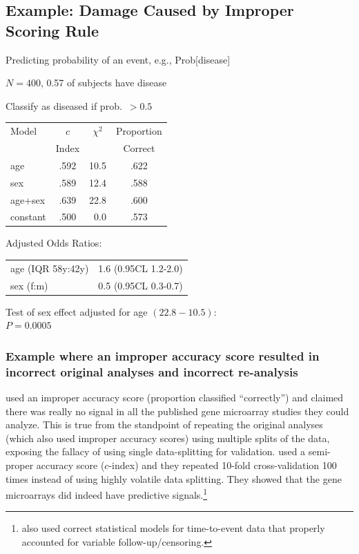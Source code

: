 \subsection{Example: Damage Caused by Improper Scoring Rule}
\bi
\item Predicting probability of an event, e.g., Prob[disease]
\item $N=400$, 0.57 of subjects have disease
\item Classify as diseased if prob.\ $>0.5$
\ei
\begin{center}\begin{tabular}{lccc}\hline
Model & $c$   & $\chi^{2}$ & Proportion \\
      & Index &            & Correct \\ \hline
age     & .592 & 10.5 & .622\\
sex     & .589 & 12.4 & .588\\
age+sex & .639 & 22.8 & .600\\
constant &.500 & ~0.0 & .573\\ \hline
\end{tabular}\end{center}

Adjusted Odds Ratios:\\
\begin{tabular}{ll}
age (IQR 58y:42y) & 1.6 (0.95CL 1.2-2.0)\\
sex (f:m)         & 0.5 (0.95CL 0.3-0.7)\\
\end{tabular}

Test of sex effect adjusted for age $(22.8-10.5)$:\\$P=0.0005$

\subsubsection{Example where an improper accuracy score resulted in incorrect original analyses and incorrect re-analysis}
\citet{mic05pre} used an improper accuracy score (proportion
classified ``correctly'') and
claimed there was really no signal in all the published gene
microarray studies they could analyze.  This is true from the
standpoint of repeating the original analyses (which also used improper
accuracy scores) using multiple splits of the data, exposing the
fallacy of using single data-splitting for validation.  \citet{ali09fac}
used a semi-proper accuracy score ($c$-index) and they repeated 10-fold
cross-validation 100 times instead of using highly volatile data
splitting.  They showed that the gene microarrays did indeed have
predictive signals.\footnote{\citet{ali09fac} also used correct
  statistical models for time-to-event data that properly accounted
  for variable follow-up/censoring.}

